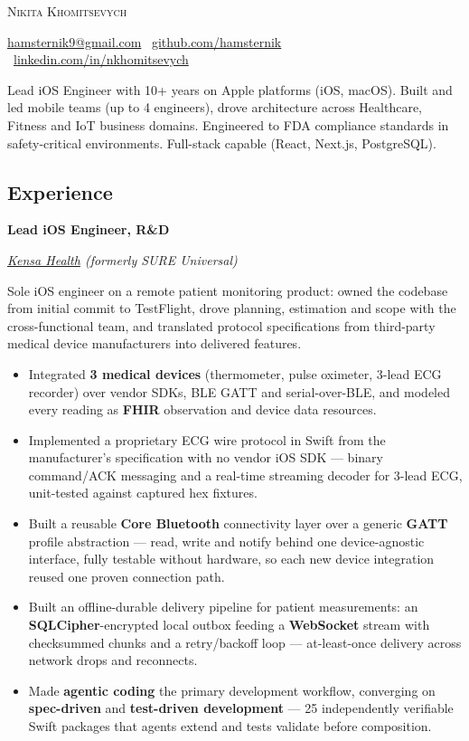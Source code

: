 \documentclass[10pt]{article}
\newcommand{\SectionSpacing}{ %
    \vspace*{0.75em}
}
\newcommand{\Experience}[3]{%
    \noindent \textbf{#1}
    \hfill \text{#2} \par
    \noindent \textit{#3} \par
    \normalsize \normalfont \par
}
\begin{document}
\textsc{\huge{Nikita Khomitsevych}}

\SectionSpacing

\noindent
\href{mailto:hamsternik9@gmail.com}{hamsternik9@gmail.com} \textbar\
\href{https://github.com/hamsternik}{github.com/hamsternik} \textbar\
\href{https://www.linkedin.com/in/nkhomitsevych/}{linkedin.com/in/nkhomitsevych}

\SectionSpacing

\noindent
Lead iOS Engineer with 10+ years on Apple platforms (iOS, macOS). Built and led mobile teams (up to 4 engineers),
drove architecture across Healthcare, Fitness and IoT business domains. Engineered to FDA compliance standards
in safety-critical environments. Full-stack capable (React, Next.js, PostgreSQL).


\subsection*{Experience}

\Experience
{Lead iOS Engineer, R\&D}
{Mar 2025 -- Aug 2026}
{\href{https://www.kensahealth.com/}{Kensa Health} (formerly SURE Universal)}

\noindent
Sole iOS engineer on a remote patient monitoring product: owned the codebase from initial
commit to TestFlight, drove planning, estimation and scope with the cross-functional team,
and translated protocol specifications from third-party medical device manufacturers into
delivered features.

\begin{itemize}[label=-]
\item Integrated \textbf{3 medical devices} (thermometer, pulse oximeter, 3-lead ECG
  recorder) over vendor SDKs, BLE GATT and serial-over-BLE, and modeled every reading as
  \textbf{FHIR} observation and device data resources.
\item Implemented a proprietary ECG wire protocol in Swift from the manufacturer's
  specification with no vendor iOS SDK — binary command/ACK messaging and a real-time
  streaming decoder for 3-lead ECG, unit-tested against captured hex fixtures.
\item Built a reusable \textbf{Core Bluetooth} connectivity layer over a generic
  \textbf{GATT} profile abstraction — read, write and notify behind one device-agnostic
  interface, fully testable without hardware, so each new device integration reused one
  proven connection path.
\item Built an offline-durable delivery pipeline for patient measurements: an
  \textbf{SQLCipher}-encrypted local outbox feeding a \textbf{WebSocket} stream with
  checksummed chunks and a retry/backoff loop — at-least-once delivery across network
  drops and reconnects.
\item Made \textbf{agentic coding} the primary development workflow, converging on
  \textbf{spec-driven} and \textbf{test-driven development} — 25 independently verifiable
  Swift packages that agents extend and tests validate before composition.
\end{itemize}
\end{document}
